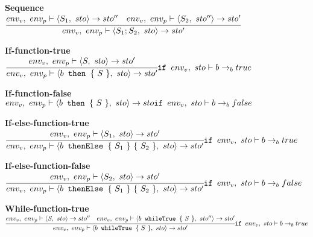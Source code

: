 \textbf{Sequence}\\
\begin{math}
	\cfrac
		{env_v,\ env_p \vdash \langle S_1,\ sto \rangle \rightarrow sto'' \quad env_v,\ env_p \vdash \langle S_2,\ sto'' \rangle \rightarrow sto'}
		{env_v,\ env_p \vdash \langle S_1;S_2,\ sto \rangle \rightarrow sto'}
\end{math}

\textbf{If-function-true}\\
\begin{math}
	\cfrac
		{env_v,\ env_p \vdash \langle S,\ sto \rangle \rightarrow sto'}
		{env_v,\ env_p \vdash \langle b \texttt{ then } \{\ S\ \},\ sto \rangle \rightarrow sto'}\\
	\texttt{if } env_v,\ sto \vdash b \rightarrow_b true
\end{math}

\textbf{If-function-false}\\
\begin{math}
	env_v,\ env_p \vdash \langle b \texttt{ then } \{\ S\ \},\ sto \rangle \rightarrow sto\\
	\texttt{if } env_v,\ sto \vdash b \rightarrow_b false
\end{math}

\textbf{If-else-function-true}\\
\begin{math}
	\cfrac
		{env_v,\ env_p \vdash \langle S_1,\ sto \rangle \rightarrow sto'}
		{env_v,\ env_p \vdash \langle b \texttt{ thenElse } \{\ S_1\ \}\ \{\ S_2\ \},\ sto \rangle \rightarrow sto'}\\
	\texttt{if } env_v,\ sto \vdash b \rightarrow_b true
\end{math}

\textbf{If-else-function-false}\\
\begin{math}
	\cfrac
		{env_v,\ env_p \vdash \langle S_2,\ sto \rangle \rightarrow sto'}
		{env_v,\ env_p \vdash \langle b \texttt{ thenElse } \{\ S_1\ \}\ \{\ S_2\ \},\ sto \rangle \rightarrow sto'}\\
	\texttt{if } env_v,\ sto \vdash b \rightarrow_b false
\end{math}

\textbf{While-function-true}\\
\begin{math}
	\cfrac
		{env_v,\ env_p \vdash \langle S,\ sto \rangle \rightarrow sto'' \quad env_v,\ env_p \vdash \langle  b \texttt{ whileTrue } \{\ S\ \} ,\ sto'' \rangle \rightarrow sto'}
		{env_v,\ env_p \vdash \langle b \texttt{ whileTrue } \{\ S\ \} ,\ sto \rangle \rightarrow sto'}\\
	\texttt{if } env_v,\ sto \vdash b \rightarrow_b true
\end{math}

